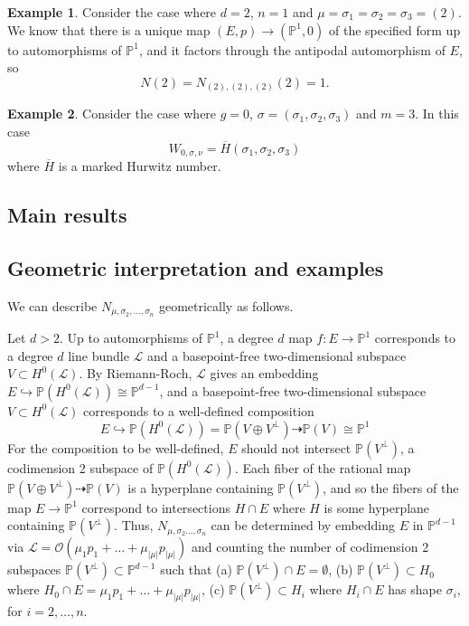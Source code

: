 \documentclass[11pt]{article}           %
\renewcommand{\P}{\mathbb P}
\theoremstyle{definition}
\newtheorem{eg}{Example}[section]
\begin{document}
\begin{eg}
  Consider the case where $d=2$, $n=1$ and $\mu=\sigma_1=\sigma_2=\sigma_3=(2)$.
  We know that there is a unique map $(E,p)\to (\mathbb P^1,0)$ of the specified form
  up to automorphisms of $\P^1$, and it factors through the antipodal automorphism of $E$,
  so
  \[
  N(2)=N_{(2),(2),(2)}(2)=1. %
  \]
\end{eg}

\begin{eg}
  Consider the case where $g=0$, $\sigma=(\sigma_1,\sigma_2,\sigma_3)$ and $m=3$. In this case
  \[
  W_{0,\sigma,\nu}=\overline H(\sigma_1,\sigma_2,\sigma_3)
  \]
  where $\overline H$ is a marked Hurwitz number.
  \end{eg}

\subsection{Main results}

\subsection{Geometric interpretation and examples}
We can describe $N_{\mu,\sigma_2,\dots,\sigma_n}$ geometrically as follows.

Let $d>2$. Up to automorphisms of $\P^1$, a degree $d$ map $f:E\to\P^1$ corresponds to a degree $d$ line bundle $\mathcal L$ and a basepoint-free two-dimensional subspace $V\subset H^0(\mathcal L)$. By Riemann-Roch, $\mathcal L$ gives an embedding $E\hookrightarrow\P(H^0(\mathcal L))\cong\P^{d-1}$, and a basepoint-free two-dimensional subspace $V\subset H^0(\mathcal L)$ corresponds to a well-defined composition
\[
E\hookrightarrow \P(H^0(\mathcal L))=\P(V\oplus V^{\perp})\dashrightarrow\P(V)\cong\P^1
\]
For the composition to be well-defined, $E$ should not intersect $\P(V^{\perp})$, a codimension 2 subspace of $\P(H^0(\mathcal L))$. Each fiber of the rational map
$\P(V\oplus V^{\perp})\dashrightarrow\P(V)$ is a hyperplane containing $\P(V^{\perp})$, and so the fibers of the map $E\to\P^1$ correspond to intersections $H\cap E$ where $H$ is some hyperplane containing $\P(V^{\perp})$. Thus, $N_{\mu,\sigma_2\dots,\sigma_n}$ can be determined by embedding $E$ in $\P^{d-1}$ via $\mathcal L=\mathcal O(\mu_{1}p_1+\dots+\mu_{|\mu|}p_{|\mu|})$ and counting the number of codimension 2 subspaces $\P(V^{\perp})\subset \P^{d-1}$ such that (a) $\P(V^{\perp})\cap E=\emptyset$, (b) $\P(V^{\perp})\subset H_0$ where $H_0\cap E=\mu_{1}p_1+\dots+\mu_{|\mu|}p_{|\mu|}$, (c) $\P(V^{\perp})\subset H_i$ where $H_i\cap E$ has shape $\sigma_i$, for $i=2,\dots,n$.
\end{document}
